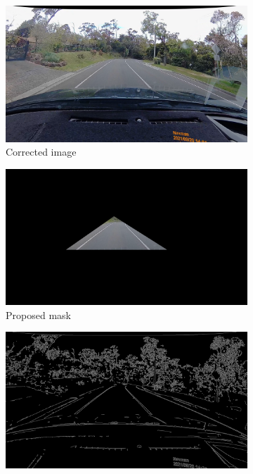 \documentclass[11pt,twoside]{report}
\begin{document}
\begin{figure}[h]
\centering
\begin{subfigure}{0.4\textwidth}
	\includegraphics[width=\textwidth]{f008_corrected.png}
	\caption{Corrected image}
\end{subfigure}
\hfill
\begin{subfigure}{0.4\textwidth}
	\includegraphics[width=\textwidth]{f009_original_cropped.png}
	\caption{Proposed mask}
\end{subfigure}
\hfill
\begin{subfigure}{0.4\textwidth}
	\includegraphics[width=\textwidth]{f009_canny.png}

\end{subfigure}
\end{figure}
\end{document}
